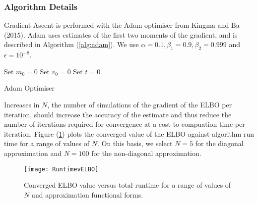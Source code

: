 \documentclass[12pt,a4paper]{article}%
\numberwithin{equation}{section}
\begin{document}
\subsubsection{Algorithm Details}

Gradient Ascent is performed with the Adam optimiser from Kingma and Ba (2015). Adam uses estimates of the first two moments of the gradient, and is described in Algorithm (\ref{alg:adam}). We use $\alpha = 0.1, \beta_1 = 0.9, \beta_2 = 0.999$ and $\epsilon = 10^{-8}$.

\begin{algorithm}[H]
 Set $m_0 = 0$\;
 Set $v_0 = 0$\;
 Set $t = 0$\;
 \caption{Adam Optimiser}
  \label{alg:adam}
\end{algorithm}

Increases in $N$, the number of simulations of the gradient of the ELBO per iteration, should increase the accuracy of the estimate and thus reduce the number of iterations required for convergence at a cost to compuation time per iteration. Figure (\ref{fig:RuntimeELBO}) plots the converged value of the ELBO against algorithm run time for a range of values of $N$. On this basis, we select $N = 5$ for the diagonal approximation and $N = 100$ for the non-diagonal approximation.

\begin{figure}[h]
\centering
\texttt{[image: RuntimevELBO]}
\caption{Converged ELBO value versus total runtime for a range of values of $N$ and approximation functional forms.}
\label{fig:RuntimeELBO}
\end{figure}
\fi
\end{document}
